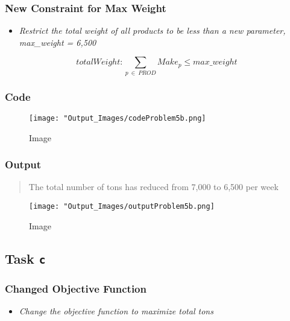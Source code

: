 \documentclass[
  12pt,
]{article}
\providecommand{\tightlist}{%
  \setlength{\itemsep}{0pt}\setlength{\parskip}{0pt}}
\begin{document}
\hypertarget{new-constraint-for-max-weight}{%
\subsubsection{New Constraint for Max
Weight}\label{new-constraint-for-max-weight}}

\begin{itemize}
\tightlist
\item
  \emph{Restrict the total weight of all products to be less than a new
  parameter, max\_weight = 6,500}
\end{itemize}

\[
totalWeight: \sum_{p \ \in \ PROD} Make_{p} \leq max\_weight
\]

\hypertarget{code-6}{%
\subsubsection{Code}\label{code-6}}

\begin{figure}
\centering
\texttt{[image: "Output\_Images/codeProblem5b.png]}
\caption{Image}
\end{figure}

\hypertarget{output-6}{%
\subsubsection{Output}\label{output-6}}

\begin{quote}
The total number of tons has reduced from 7,000 to 6,500 per week
\end{quote}

\begin{figure}
\centering
\texttt{[image: "Output\_Images/outputProblem5b.png]}
\caption{Image}
\end{figure}

\hypertarget{task-c-1}{%
\subsection{\texorpdfstring{Task \texttt{c}}{Task c}}\label{task-c-1}}

\hypertarget{changed-objective-function}{%
\subsubsection{Changed Objective
Function}\label{changed-objective-function}}

\begin{itemize}
\tightlist
\item
  \emph{Change the objective function to maximize total tons}
\end{itemize}
\end{document}
